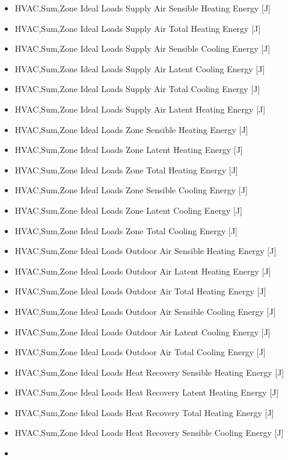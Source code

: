 \begin{itemize}
\item
  HVAC,Sum,Zone Ideal Loads Supply Air Sensible Heating Energy {[}J{]}
\item
  HVAC,Sum,Zone Ideal Loads Supply Air Total Heating Energy {[}J{]}
\item
  HVAC,Sum,Zone Ideal Loads Supply Air Sensible Cooling Energy {[}J{]}
\item
  HVAC,Sum,Zone Ideal Loads Supply Air Latent Cooling Energy {[}J{]}
\item
  HVAC,Sum,Zone Ideal Loads Supply Air Total Cooling Energy {[}J{]}
\item
  HVAC,Sum,Zone Ideal Loads Supply Air Latent Heating Energy {[}J{]}
\item
  HVAC,Sum,Zone Ideal Loads Zone Sensible Heating Energy {[}J{]}
\item
  HVAC,Sum,Zone Ideal Loads Zone Latent Heating Energy {[}J{]}
\item
  HVAC,Sum,Zone Ideal Loads Zone Total Heating Energy {[}J{]}
\item
  HVAC,Sum,Zone Ideal Loads Zone Sensible Cooling Energy {[}J{]}
\item
  HVAC,Sum,Zone Ideal Loads Zone Latent Cooling Energy {[}J{]}
\item
  HVAC,Sum,Zone Ideal Loads Zone Total Cooling Energy {[}J{]}
\item
  HVAC,Sum,Zone Ideal Loads Outdoor Air Sensible Heating Energy {[}J{]}
\item
  HVAC,Sum,Zone Ideal Loads Outdoor Air Latent Heating Energy {[}J{]}
\item
  HVAC,Sum,Zone Ideal Loads Outdoor Air Total Heating Energy {[}J{]}
\item
  HVAC,Sum,Zone Ideal Loads Outdoor Air Sensible Cooling Energy {[}J{]}
\item
  HVAC,Sum,Zone Ideal Loads Outdoor Air Latent Cooling Energy {[}J{]}
\item
  HVAC,Sum,Zone Ideal Loads Outdoor Air Total Cooling Energy {[}J{]}
\item
  HVAC,Sum,Zone Ideal Loads Heat Recovery Sensible Heating Energy {[}J{]}
\item
  HVAC,Sum,Zone Ideal Loads Heat Recovery Latent Heating Energy {[}J{]}
\item
  HVAC,Sum,Zone Ideal Loads Heat Recovery Total Heating Energy {[}J{]}
\item
  HVAC,Sum,Zone Ideal Loads Heat Recovery Sensible Cooling Energy {[}J{]}
\item

\end{itemize}
